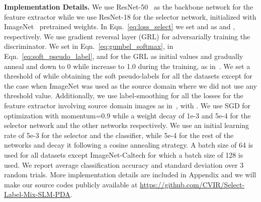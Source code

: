 \documentclass[10pt,twocolumn,letterpaper]{article}
\begin{document}
\vspace{1mm}
\noindent\textbf{Implementation Details.} 
We use ResNet-50~\cite{he2016deep} as the backbone network for the feature extractor while we use ResNet-18 for the selector network, initialized with ImageNet~\cite{russakovsky2015imagenet} pretrained weights. 
In Eqn.~\ref{eq:loss_select} we set  and  as  and , respectively. We use gradient reversal layer (GRL) for adversarially training the discriminator. We set  in Eqn.~\ref{eq:gumbel_softmax},  in Eqn.~\ref{eq:soft_pseudo_label}, and  for the GRL as initial values and gradually anneal  and  down to 0 while increase  to 1.0 during the training, as in~\cite{jang2016categorical}. We set a threshold of  while obtaining the soft pseudo-labels for all the datasets except for the case when ImageNet was used as the source domain where we did not use any threshold value. Additionally, we use label-smoothing for all the losses for the feature extractor involving source domain images as in~\cite{liang2020we, muller2019does}, with .
We use SGD for optimization with momentum=0.9 while a weight decay of 1e-3 and 5e-4 for the selector network and the other networks respectively. We use an initial learning rate of 5e-3 for the selector and the classifier, while 5e-4 for the rest of the networks and decay it following a cosine annealing strategy. A batch size of 64 is used for all datasets except ImageNet-Caltech for which a batch size of 128 is used. We report average classification accuracy and standard deviation over 3 random trials. More implementation details are included in Appendix and we will make our source codes publicly available at \url{https://github.com/CVIR/Select-Label-Mix-SLM-PDA}.
\end{document}
